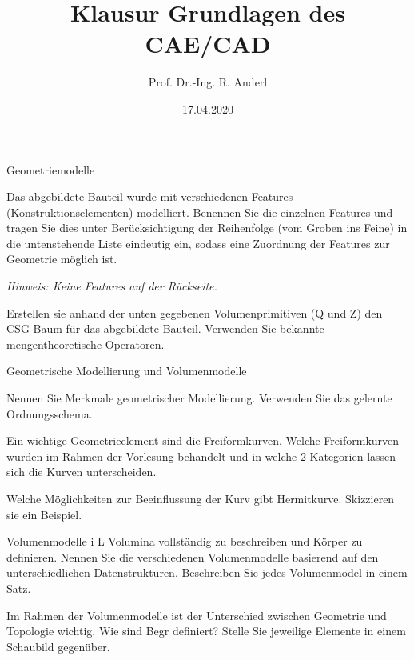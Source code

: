 \documentclass[
	ngerman,
	color = black,
	]{tudaexercise}
\begin{document}
\title[Übung TUDaExercise]{Klausur Grundlagen des CAE/CAD}
\author{Prof. Dr.-Ing. R. Anderl}
\date{17.04.2020}

\maketitle

\begin{task}[credit=13 P]{Geometriemodelle}
	\begin{subtask}[credit=4 P]
		Das abgebildete Bauteil wurde mit verschiedenen Features (Konstruktionselementen) modelliert.
		Benennen Sie die einzelnen Features und tragen Sie dies unter Berücksichtigung der Reihenfolge (vom Groben ins Feine) in die untenstehende Liste eindeutig ein, sodass eine Zuordnung der Features zur Geometrie möglich ist.
		
		\textit{Hinweis: Keine Features auf der Rückseite.} %
	\end{subtask}
	
	\begin{subtask}[credit=9 P]
		Erstellen sie anhand der unten gegebenen Volumenprimitiven (Q und Z) den CSG-Baum für das abgebildete Bauteil.
		Verwenden Sie bekannte mengentheoretische Operatoren.
	\end{subtask}

	
\end{task}

\begin{task}[credit=21 P]{Geometrische Modellierung und Volumenmodelle}
	\begin{subtask}[credit=6 P]
		Nennen Sie Merkmale geometrischer Modellierung.
		Verwenden Sie das gelernte Ordnungsschema.
	\end{subtask}
	
	\begin{subtask}[credit=2{,}5 P]
		Ein wichtige Geometrieelement sind die Freiformkurven.
		Welche Freiformkurven wurden im Rahmen der Vorlesung behandelt und in welche 2 Kategorien lassen sich die Kurven unterscheiden.
	\end{subtask}
	
	\begin{subtask}[credit=1{,}5 P]
		Welche Möglichkeiten zur Beeinflussung der Kurv gibt Hermitkurve.
		Skizzieren sie ein Beispiel.
	\end{subtask}
	
	\begin{subtask}[credit=6 P]
		Volumenmodelle i L Volumina vollständig zu beschreiben und Körper zu definieren.
		Nennen Sie die verschiedenen Volumenmodelle basierend auf den unterschiedlichen Datenstrukturen.
		Beschreiben Sie jedes Volumenmodel in einem Satz.
	\end{subtask}
	
	\begin{subtask}[credit=5 P]
		Im Rahmen der Volumenmodelle ist der Unterschied zwischen Geometrie und Topologie wichtig.
		Wie sind Begr definiert?
		Stelle Sie jeweilige Elemente in einem Schaubild gegenüber.
	\end{subtask}
	
\end{task}
\end{document}
